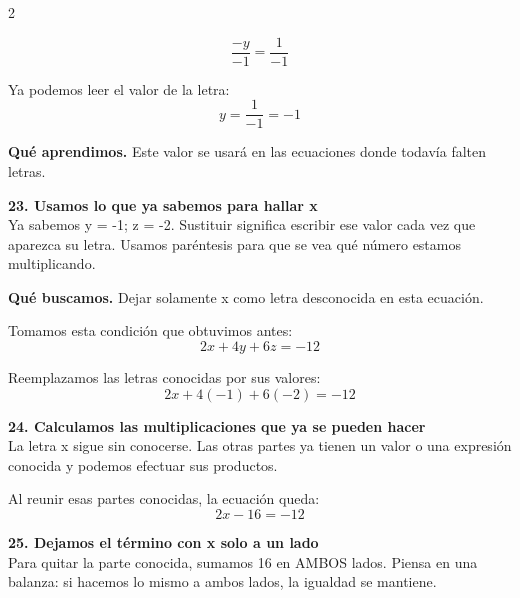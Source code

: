 \documentclass[11pt,a4paper,landscape]{article}
\begin{document}
\begin{multicols*}{2}
\begin{minipage}{\linewidth}
\[\frac{-y}{-1}=\frac{1}{-1}\]
\par\smallskip Ya podemos leer el valor de la letra:
\[y=\frac{1}{-1}=-1\]
\par\smallskip\textbf{Qué aprendimos.} Este valor se usará en las ecuaciones donde todavía falten letras.
\end{minipage}\par\medskip
\noindent\begin{minipage}{\linewidth}\textbf{23. Usamos lo que ya sabemos para hallar x}\\[2pt]Ya sabemos y = -1; z = -2. Sustituir significa escribir ese valor cada vez que aparezca su letra. Usamos paréntesis para que se vea qué número estamos multiplicando.
\par\smallskip\textbf{Qué buscamos.} Dejar solamente x como letra desconocida en esta ecuación.
\par\smallskip Tomamos esta condición que obtuvimos antes:
\[2x + 4y + 6z = -12\]
\par\smallskip Reemplazamos las letras conocidas por sus valores:
\[2x + 4\left(-1\right) + 6\left(-2\right)=-12\]
\end{minipage}\par\medskip
\noindent\begin{minipage}{\linewidth}\textbf{24. Calculamos las multiplicaciones que ya se pueden hacer}\\[2pt]La letra x sigue sin conocerse. Las otras partes ya tienen un valor o una expresión conocida y podemos efectuar sus productos.
\par{}\par\smallskip
\par\smallskip Al reunir esas partes conocidas, la ecuación queda:
\[2x - 16=-12\]
\end{minipage}\par\medskip
\noindent\begin{minipage}{\linewidth}\textbf{25. Dejamos el término con x solo a un lado}\\[2pt]Para quitar la parte conocida, sumamos 16 en AMBOS lados. Piensa en una balanza: si hacemos lo mismo a ambos lados, la igualdad se mantiene.

\end{minipage}
\end{multicols*}
\end{document}
